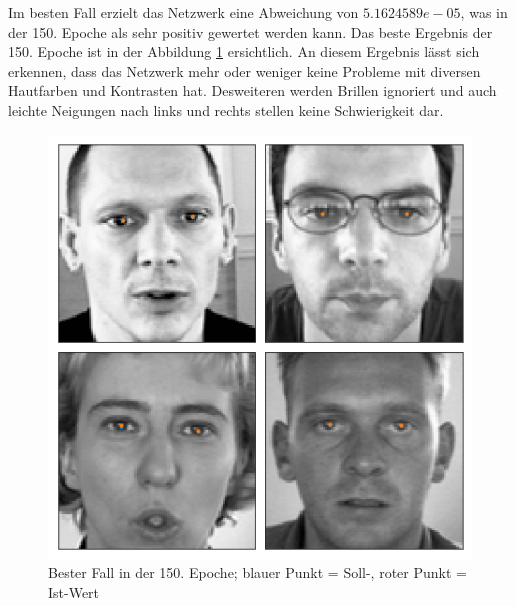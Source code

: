 \noindent
Im besten Fall erzielt das Netzwerk eine Abweichung von $5.1624589e-05$, was in der 150. Epoche als sehr positiv gewertet werden kann.
Das beste Ergebnis der 150. Epoche ist in der Abbildung \ref{fig:good} ersichtlich. 
An diesem Ergebnis lässt sich erkennen, dass das Netzwerk mehr oder weniger keine Probleme mit diversen Hautfarben und Kontrasten hat. 
Desweiteren werden Brillen ignoriert und auch leichte Neigungen nach links und rechts stellen keine Schwierigkeit dar. 
\begin{figure}[ht!]
	\centering
	\includegraphics[scale=0.6]{images/Good_2.png}
	\caption{Bester Fall in der 150. Epoche; blauer Punkt = Soll-, roter Punkt = Ist-Wert}
	\label{fig:good}
\end{figure} \phantom \newline

